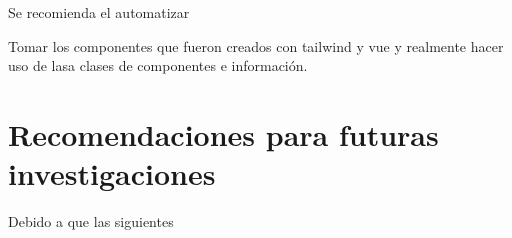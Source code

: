 Se recomienda el automatizar



Tomar los componentes que fueron creados con tailwind y vue y realmente hacer uso de lasa clases de componentes e información.






\section{Recomendaciones para futuras investigaciones}

Debido a que las siguientes


